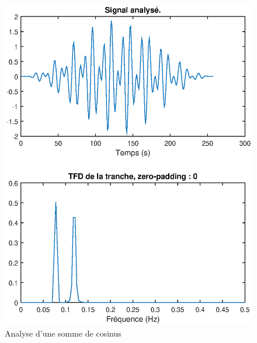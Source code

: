 \documentclass[french]{article}
\begin{document}
\begin{figure}[h!]
\begin{minipage}{0.45\textwidth}
		\includegraphics[width=\textwidth]{images/hanning_sans_0p.eps}
		\caption{Analyse d'une somme de cosinus}
		\label{fig:hanning_sans_0p}
	\end{minipage}
\end{figure}
\end{document}
